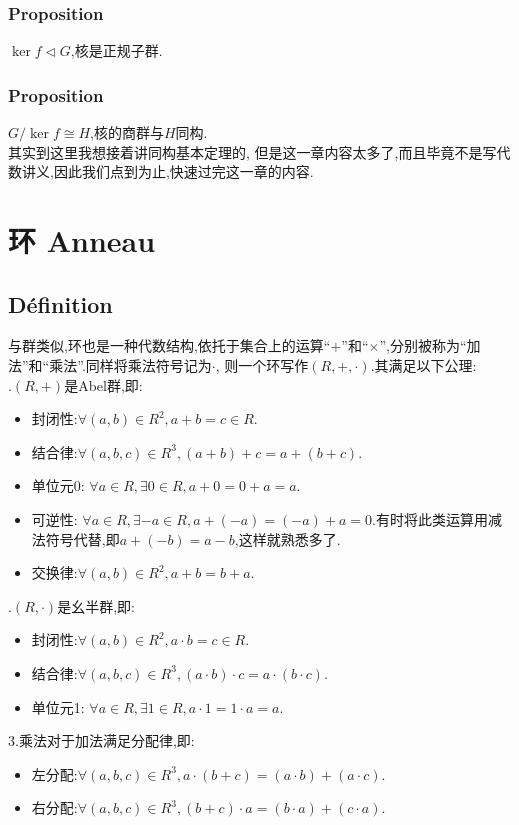 \documentclass[12pt, a4paper, oneside]{ctexbook}
\begin{document}
  \subsubsection{Proposition}
  $\ker f\lhd G$,核是正规子群.
  \subsubsection{Proposition}
  $G/\ker f\cong H$,核的商群与$H$同构.\\
  
  其实到这里我想接着讲同构基本定理的,
  但是这一章内容太多了,而且毕竟不是写代数讲义,因此我们点到为止,快速过完这一章的内容.


  \section{环 Anneau}
  \subsection{Définition}
  与群类似,环也是一种代数结构,依托于集合上的运算“$+$”和“$\times$”,分别被称为“加法”和“乘法”.同样将乘法符号记为$\cdot$,
  则一个环写作$(R,+,\cdot)$.其满足以下公理:\\

  .$(R,+)$是Abel群,即:
  \begin{itemize}
    \item 封闭性:$\forall(a,b)\in R^2,a+b=c\in R $.
    \item 结合律:$\forall(a,b,c)\in R^3,(a+ b)+ c=a+ (b+ c) $.
    \item 单位元0: $\forall a\in R, \exists 0\in R, a+0=0+a=a$.
    \item 可逆性: $\forall a\in R, \exists -a\in R, a+(-a)=(-a)+a=0$.有时将此类运算用减法符号代替,即$a+(-b)=a-b$,这样就熟悉多了.
    \item 交换律:$\forall(a,b)\in R^2,a+b=b+a$.
  \end{itemize}
  

  .$(R,\cdot)$是幺半群,即:
  \begin{itemize}
    \item 封闭性:$\forall(a,b)\in R^2,a\cdot b=c\in R $.
    \item 结合律:$\forall(a,b,c)\in R^3,(a\cdot b)\cdot c=a\cdot (b\cdot c) $.
    \item 单位元1: $\forall a\in R, \exists 1\in R, a\cdot 1=1\cdot a=a$.
  \end{itemize}


  \noindent
  3.乘法对于加法满足分配律,即:
  \begin{itemize}
    \item 左分配:$\forall(a,b,c)\in R^3,a\cdot (b+ c)=(a\cdot b)+(a\cdot c)$.
    \item 右分配:$\forall(a,b,c)\in R^3,(b+ c)\cdot a=(b\cdot a)+(c\cdot a)$.
  \end{itemize}
\end{document}
